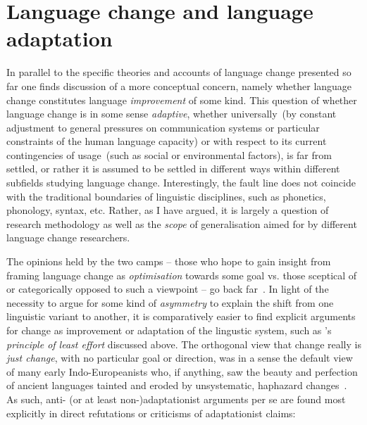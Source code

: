 \section{Language change and language adaptation}\label{sec:adaptationism}


In parallel to the specific theories and accounts of language change presented so far one finds discussion of a more conceptual concern, namely whether language change constitutes language \emph{improvement} of some kind.
This question of whether language change is in some sense \emph{adaptive},
whether universally~(by constant adjustment to general pressures on communication systems or particular constraints of the human language capacity) or with respect to its current contingencies of usage~(such as social or environmental factors),
is far from settled, or rather it is assumed to be settled in different ways within different subfields studying language change. Interestingly, the fault line does not coincide with the traditional boundaries of linguistic disciplines, such as phonetics, phonology, syntax, etc. Rather, as I have argued, it is largely a question of research methodology as well as the \emph{scope} of generalisation aimed for by different language change researchers.

The opinions held by the two camps -- those who hope to gain insight from framing language change as \emph{optimisation} towards some goal vs. those sceptical of or categorically opposed to such a viewpoint -- go back far~\citep[see][ch.XIV]{Jespersen1922}.
In light of the necessity to argue for some kind of \emph{asymmetry} to explain the shift from one linguistic variant to another, it is comparatively easier to find explicit arguments for change as improvement or adaptation of the lingustic system, such as \citet{Zipf1949}'s \emph{principle of least effort} discussed above.
The orthogonal view that change really is \emph{just change}, with no particular goal or direction, was in a sense the default view of many early Indo-Europeanists who, if anything, saw the beauty and perfection of ancient languages tainted and eroded by unsystematic, haphazard changes~\citep[ch.II]{Jespersen1922}. As such, anti- (or at least non-)adaptationist arguments per se are found most explicitly in direct refutations or criticisms of adaptationist claims:


